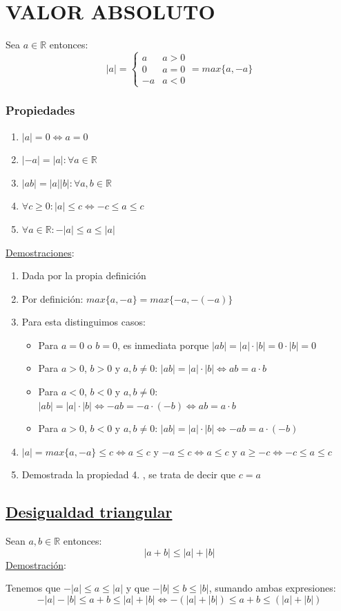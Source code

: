 \documentclass[10pt,a4paper,openright]{book}
\theoremstyle{break}
\begin{document}
\section{VALOR ABSOLUTO}
Sea $a\in \mathbb R$ entonces:
$$
|a|=
\begin{cases}
a & a>0 \\
0 & a=0 \\
-a & a<0
\end{cases}
=max\{a,-a\}
$$
\subsubsection{Propiedades}
\begin{enumerate}
\item $|a|=0\Leftrightarrow a=0$
\item $|-a|=|a|: \forall a \in \mathbb R$
\item $|ab|=|a||b|: \forall a,b\in \mathbb R$
\item $\forall c\geq 0: |a|\leq c \Leftrightarrow -c\leq a\leq c$
\item $\forall a \in \mathbb R: -|a|\leq a\leq |a|$
\end{enumerate}
\underline{Demostraciones}:
\begin{enumerate}
\item Dada por la propia definición
\item Por definición: $max\{a,-a\}=max\{-a,-(-a)\}$
\item Para esta distinguimos casos:
	\begin{itemize}
	\item Para $a=0$ o $b=0$, es inmediata porque $|ab|=|a|\cdot |b|=0\cdot |b|=0$
	\item Para $a>0$, $b>0$ y $a,b\neq 0$: $|ab|=|a|\cdot |b|\Leftrightarrow ab=a\cdot b$
	\item Para $a<0$, $b<0$ y $a,b\neq 0$:$|ab|=|a|\cdot |b|\Leftrightarrow -ab=-a\cdot (-b)\Leftrightarrow ab=a\cdot b$
	\item Para $a>0$, $b<0$ y $a,b\neq 0$: $|ab|=|a|\cdot |b|\Leftrightarrow -ab=a\cdot(-b)$
	\end{itemize}

\item $|a|=max\{a,-a\}\leq c\Leftrightarrow a\leq c$ y $-a\leq c\Leftrightarrow a\leq c$ y $a\geq -c\Leftrightarrow -c\leq a\leq c$
\item Demostrada la propiedad 4. , se trata de decir que $c=a$
\end{enumerate}

\subsection{\underline{Desigualdad triangular}}
Sean $a,b\in \mathbb R$ entonces:
$$|a+b|\leq|a|+|b|$$
\underline{Demostración}:\par
Tenemos que $-|a|\leq a\leq |a|$ y que $-|b|\leq b\leq |b|$, sumando ambas expresiones:
$$-|a|-|b|\leq a+b\leq |a|+|b|\Leftrightarrow -(|a|+|b|)\leq a+b\leq (|a|+|b|)$$
\end{document}

